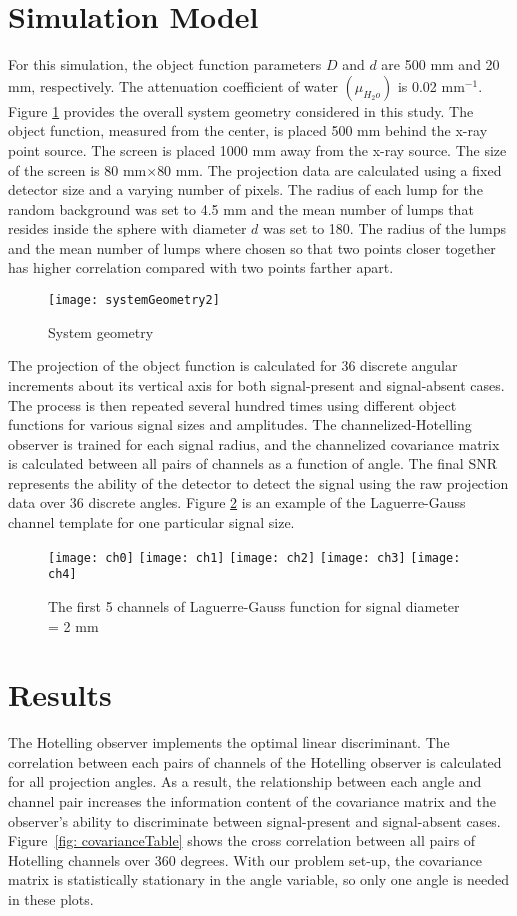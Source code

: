 \section{Simulation Model}
For this simulation, the object function parameters $D$ and $d$ are 500 mm and 20 mm, respectively.  The attenuation coefficient of water $(\mu_{H_2o})$ is 0.02 mm$^{-1}$.  Figure \ref{fig:system geometry} provides the overall system geometry considered in this study.  The object function, measured from the center, is placed 500 mm behind the x-ray point source.  The screen is placed 1000 mm away from the x-ray source.  The size of the screen is 80 mm$\times$80 mm.  The projection data are calculated using a fixed detector size and a varying number of pixels.  The radius of each lump for the random background was set to 4.5 mm and the mean number of lumps that resides inside the sphere with diameter $d$ was set to 180.  The radius of the lumps and the mean number of lumps where chosen so that two points closer together has higher correlation compared with two points farther apart.
%
\begin{figure}
\texttt{[image: systemGeometry2]}
\caption{System geometry}
\label{fig:system geometry}
\end{figure} 
%
The projection of the object function is calculated for 36 discrete angular increments about its vertical axis for both signal-present and signal-absent cases.  The process is then repeated several hundred times using different object functions for various signal sizes and amplitudes.  The channelized-Hotelling observer is trained for each signal radius, and the channelized covariance matrix is calculated between all pairs of channels as a function of angle.  The final SNR represents the ability of the detector to detect the signal using the raw projection data over 36 discrete angles.  Figure \ref{fig: channel template} is an example of the Laguerre-Gauss channel template for one particular signal size.
%
\begin{figure}[ht]
\texttt{[image: ch0]}
\texttt{[image: ch1]}
\texttt{[image: ch2]}
\texttt{[image: ch3]}
\texttt{[image: ch4]} 
\caption{The first 5 channels of Laguerre-Gauss function for signal diameter = 2 mm}
\label{fig: channel template} 
\end{figure}

\section{Results}
The Hotelling observer implements the optimal linear discriminant. The correlation between each pairs of channels of the Hotelling observer is calculated for all projection angles.  As a result, the relationship between each angle and channel pair increases the information content of the covariance matrix and the observer's ability to discriminate between signal-present and signal-absent cases. Figure~\ref{fig: covarianceTable} shows the cross correlation between all pairs of Hotelling channels over 360 degrees.  With our problem set-up, the covariance matrix is statistically stationary in the angle variable, so only one angle is needed in these plots.

